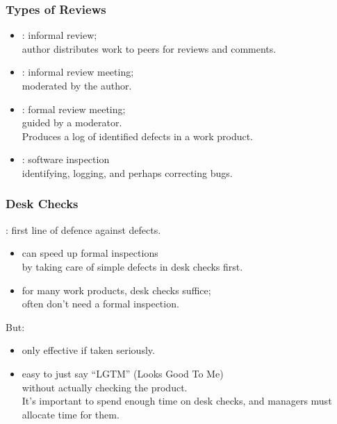 \begin{frame}
\frametitle{Types of Reviews}

\begin{changemargin}{1cm}
\begin{itemize}
\item {}: informal review; \\ \qquad author distributes
work to peers for reviews and comments.
\item {}: informal review meeting; \\ \qquad moderated by the author.
\item {}: formal review meeting; \\ \qquad guided by a moderator.\\
Produces a log of identified defects in a work product.
\item {}: software inspection \\ \qquad identifying, logging, and perhaps correcting bugs.
\end{itemize}
\end{changemargin}

\end{frame}

\begin{frame}

\frametitle{Desk Checks}

\begin{changemargin}{1cm}
: first line of defence against defects.  

\begin{itemize}
\item can speed up formal inspections \\ by taking care of simple defects in
desk checks first. 
\item for many work products, desk checks suffice; \\ often don't need a formal inspection.
\end{itemize}

But:
\begin{itemize}
\item only effective if taken seriously. 
\item easy
to just say ``LGTM'' (Looks Good To Me)\\ without actually checking the
product. \\[1em]

It's important to spend enough time on desk checks, and
managers must allocate time for them. 
\end{itemize}
\end{changemargin}

\end{frame}

